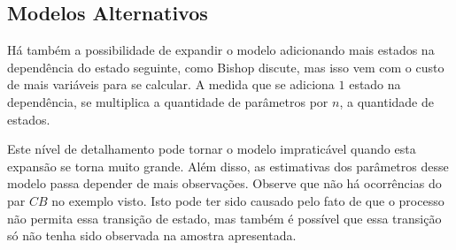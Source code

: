 \documentclass{subfiles}
\begin{document}
\subsection{Modelos Alternativos}
Há também a possibilidade de expandir o modelo adicionando mais estados na dependência do estado seguinte, como Bishop\autocite{Bishop:2006pat} discute, mas isso vem com o custo de mais variáveis para se calcular. A medida que se adiciona $1$ estado na dependência, se multiplica a quantidade de parâmetros por $n$, a quantidade de estados.

Este nível de detalhamento pode tornar o modelo impraticável quando esta expansão se torna muito grande. Além disso, as estimativas dos parâmetros desse modelo passa depender de mais observações. Observe que não há ocorrências do par $CB$ no exemplo visto. Isto pode ter sido causado pelo fato de que o processo não permita essa transição de estado, mas também é possível que essa transição só não tenha sido observada na amostra apresentada.
\end{document}
